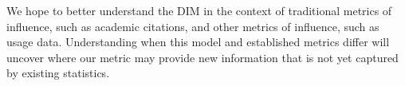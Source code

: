 We hope to better understand the DIM in the context of traditional
metrics of influence, such as academic citations, and other metrics of
influence, such as usage data.  Understanding when this model and
established metrics differ will uncover where our metric may provide
new information that is not yet captured by existing statistics.


